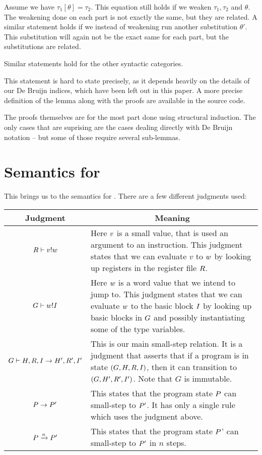 \begin{lemma}
  Assume we have $\tau_1[\theta] = \tau_2$. This equation still holds if we
  weaken $\tau_1, \tau_2$ and $\theta$. The weakening done on each part is not
  exactly the same, but they are related. A similar statement holds if we
  instead of weakening run another substitution $\theta'$. This substitution
  will again not be the exact same for each part, but the substitutions are
  related.

  Similar statements hold for the other syntactic categories.
\end{lemma}

This statement is hard to state precisely, as it depends heavily on the details
of our De Bruijn indices, which have been left out in this paper. A more precise
definition of the lemma along with the proofs are available in the source code.

The proofs themselves are for the most part done using structural induction. The
only cases that are suprising are the cases dealing directly with De Bruijn
notation -- but some of those require several sub-lemmas.

\section{Semantics for \ATAL}

This brings us to the semantics for \ATAL. There are a few different judgments
used:

\begin{tabular}{|c|p{7.5 cm}|}
  \hline
  Judgment & \multicolumn{1}{|c|}{Meaning} \\\hline
  ${R} |- {v} ! {w}$ & Here $v$ is a small value, that is used an argument to an instruction. This judgment states that we can evaluate $v$ to $w$ by looking up registers in the register file $R$. \\\hline
  ${G} |- {w} ! {I}$ & Here $w$ is a word value that we intend to jump to. This judgment states that we can evaluate $w$ to the basic block $I$ by looking up basic blocks in $G$ and possibly instantiating some of the type variables. \\\hline
  ${G} |- {H, R, I} -> {H', R', I'}$ & This is our main small-step relation. It is a judgment that asserts that if a program is in state $(G, H, R, I)$, then it can transition to $(G, H', R', I')$. Note that $G$ is immutable. \\\hline
  ${P} -> {P'}$ & This states that the program state $P$ can small-step to $P'$. It has only a single rule which uses the judgment above. \\\hline
  ${P} \xrightarrow{n} {P'}$ & This states that the program state $P$' can small-step to $P'$ in $n$ steps. \\\hline
\end{tabular} \\

